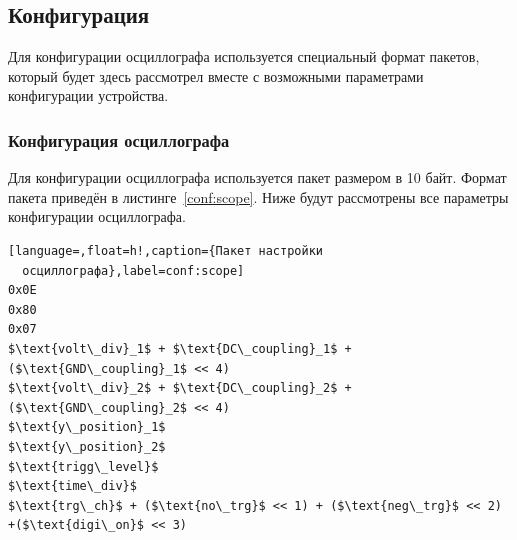 \documentclass[a4paper,12pt]{report}
\numberwithin{equation}{section}
\begin{document}
\subsection{Конфигурация} \label{configuration}
Для конфигурации осциллографа используется специальный формат пакетов, который
будет здесь рассмотрел вместе с возможными параметрами конфигурации устройства.

\subsubsection{Конфигурация осциллографа}
Для конфигурации осциллографа используется пакет размером в 10 байт. Формат
пакета приведён в листинге~\ref{conf:scope}. Ниже будут рассмотрены все
параметры конфигурации осциллографа.

\begin{lstlisting}[language=,float=h!,caption={Пакет настройки
  осциллографа},label=conf:scope]
0x0E
0x80
0x07
$\text{volt\_div}_1$ + $\text{DC\_coupling}_1$ + ($\text{GND\_coupling}_1$ << 4)
$\text{volt\_div}_2$ + $\text{DC\_coupling}_2$ + ($\text{GND\_coupling}_2$ << 4)
$\text{y\_position}_1$
$\text{y\_position}_2$
$\text{trigg\_level}$
$\text{time\_div}$
$\text{trg\_ch}$ + ($\text{no\_trg}$ << 1) + ($\text{neg\_trg}$ << 2) +($\text{digi\_on}$ << 3)
\end{lstlisting}
\end{document}
